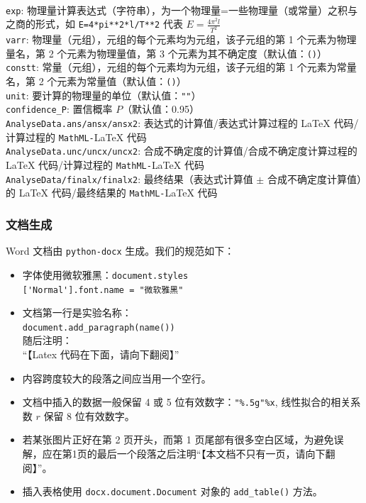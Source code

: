\begin{description}
  \\
  \verb|exp|: 物理量计算表达式（字符串），为一个物理量=一些物理量（或常量）之积与之商的形式，如 \verb|E=4*pi**2*l/T**2| 代表 \(E=\frac{4\pi^2l}{T^2}\)\\
  \verb|varr|: 物理量（元组），元组的每个元素均为元组，该子元组的第 1 个元素为物理量名，第 2 个元素为物理量值，第 3 个元素为其不确定度（默认值：\verb|()|）\\
  \verb|constt|: 常量（元组），元组的每个元素均为元组，该子元组的第 1 个元素为常量名，第 2 个元素为常量值（默认值：\verb|()|）\\
  \verb|unit|: 要计算的物理量的单位（默认值：\verb|""|）\\
  \verb|confidence_P|: 置信概率 \(P\)（默认值：0.95）\\
  \verb|AnalyseData.ans/ansx/ansx2|: 表达式的计算值/表达式计算过程的 \LaTeX{} 代码/计算过程的 \verb|MathML-|\LaTeX{} 代码\\
  \verb|AnalyseData.unc/uncx/uncx2|: 合成不确定度的计算值/合成不确定度计算过程的 \LaTeX{} 代码/计算过程的 \verb|MathML-|\LaTeX{} 代码\\
  \verb|AnalyseData/finalx/finalx2|: 最终结果（表达式计算值 \(\pm\) 合成不确定度计算值）的 \LaTeX{} 代码/最终结果的 \verb|MathML-|\LaTeX{} 代码
\end{description}

\subsubsection{文档生成}

Word 文档由 \verb|python-docx| 生成。我们的规范如下：
\begin{itemize}
  \item 字体使用微软雅黑：\verb|document.styles|\\\verb|['Normal'].font.name = "微软雅黑"|
  \item 文档第一行是实验名称：\\\verb|document.add_paragraph(name())|\\随后注明：\\“【Latex 代码在下面，请向下翻阅】”
  \item 内容跨度较大的段落之间应当用一个空行。
  \item 文档中插入的数据一般保留 4 或 5 位有效数字：\verb|"%.5g"%x|, 线性拟合的相关系数 \(r\) 保留 8 位有效数字。
  \item 若某张图片正好在第 2 页开头，而第 1 页尾部有很多空白区域，为避免误解，应在第1页的最后一个段落之后注明“【本文档不只有一页，请向下翻阅】”。
  \item 插入表格使用 \verb|docx.document.Document| 对象的 \verb|add_table()| 方法。
\end{itemize}

